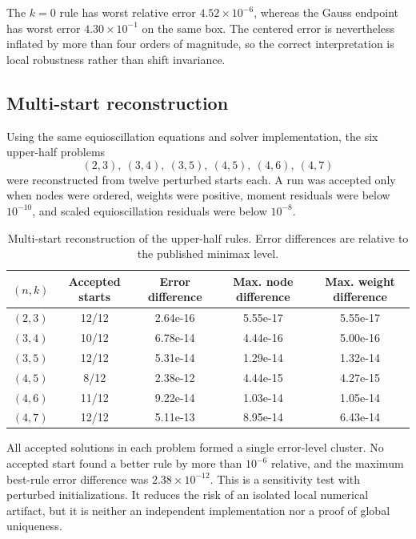 \documentclass[preprint,12pt]{elsarticle}
\theoremstyle{remark}
\begin{document}
The \(k=0\) rule has worst relative error
\(4.52\times10^{-6}\), whereas the Gauss endpoint has worst error
\(4.30\times10^{-1}\) on the same box. The centered error is nevertheless
inflated by more than four orders of magnitude, so the correct
interpretation is local robustness rather than shift invariance.

\subsection{Multi-start reconstruction}

Using the same equioscillation equations and solver implementation, the six upper-half problems
\[
(2,3),\ (3,4),\ (3,5),\ (4,5),\ (4,6),\ (4,7)
\]
were reconstructed from twelve perturbed starts each. A run was accepted
only when nodes were ordered, weights were positive, moment residuals
were below \(10^{-10}\), and scaled equioscillation residuals were below
\(10^{-8}\).

\begin{table}[ht]
\centering
\caption{Multi-start reconstruction of the upper-half
rules. Error differences are relative to the published minimax level.}
\label{tab:multistart}
\scriptsize
\begin{tabular}{ccccc}
\toprule
\((n,k)\) & Accepted starts & Error difference &
Max. node difference & Max. weight difference\\
\midrule
$(2,3)$ & 12/12 & 2.64e-16 & 5.55e-17 & 5.55e-17 \\
$(3,4)$ & 10/12 & 6.78e-14 & 4.44e-16 & 5.00e-16 \\
$(3,5)$ & 12/12 & 5.31e-14 & 1.29e-14 & 1.32e-14 \\
$(4,5)$ & 8/12 & 2.38e-12 & 4.44e-15 & 4.27e-15 \\
$(4,6)$ & 11/12 & 9.22e-14 & 1.03e-14 & 1.05e-14 \\
$(4,7)$ & 12/12 & 5.11e-13 & 8.95e-14 & 6.43e-14 \\
\bottomrule
\end{tabular}
\end{table}

All accepted solutions in each problem formed a single error-level
cluster. No accepted start found a better rule by more than
\(10^{-6}\) relative, and the maximum best-rule error difference was
\(2.38\times10^{-12}\). This is a sensitivity test with perturbed initializations. It reduces the risk of an isolated local numerical artifact, but it is neither an independent implementation nor a proof of global uniqueness.
\end{document}
